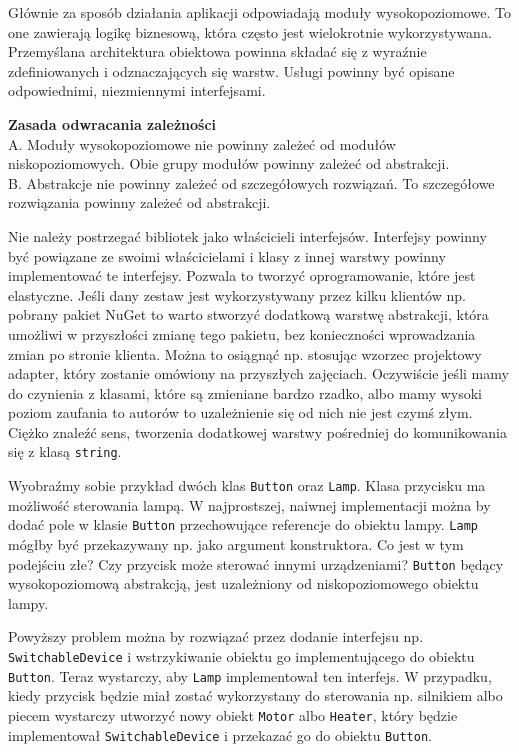 Głównie za sposób działania aplikacji odpowiadają moduły wysokopoziomowe. To one zawierają logikę biznesową, która często jest wielokrotnie wykorzystywana. Przemyślana architektura obiektowa powinna składać się z wyraźnie zdefiniowanych i odznaczających się warstw. Usługi powinny być opisane odpowiednimi, niezmiennymi interfejsami.

\begin{tcolorbox}[colback=yellow]	
	\textbf{Zasada odwracania zależności}\\
	A. Moduły wysokopoziomowe nie powinny zależeć od modułów niskopoziomowych. Obie grupy modułów powinny zależeć od abstrakcji.\\
	B. Abstrakcje nie powinny zależeć od szczegółowych rozwiązań. To szczegółowe rozwiązania powinny zależeć od abstrakcji.
\end{tcolorbox}

Nie należy postrzegać bibliotek jako właścicieli interfejsów. Interfejsy powinny być powiązane ze swoimi właścicielami i klasy z innej warstwy powinny implementować te interfejsy. Pozwala to tworzyć oprogramowanie, które jest elastyczne. Jeśli dany zestaw jest wykorzystywany przez kilku klientów np. pobrany pakiet NuGet to warto stworzyć dodatkową warstwę abstrakcji, która umożliwi w przyszłości zmianę tego pakietu, bez konieczności wprowadzania zmian po stronie klienta. Można to osiągnąć np. stosując wzorzec projektowy adapter, który zostanie omówiony na przyszłych zajęciach. Oczywiście jeśli mamy do czynienia z klasami, które są zmieniane bardzo rzadko, albo mamy wysoki poziom zaufania to autorów to uzależnienie się od nich nie jest czymś złym. Ciężko znaleźć sens, tworzenia dodatkowej warstwy pośredniej do komunikowania się z klasą \texttt{string}.

Wyobraźmy sobie przykład dwóch klas \texttt{Button} oraz \texttt{Lamp}. Klasa przycisku ma możliwość sterowania lampą. W najprostszej, naiwnej implementacji można by dodać pole w klasie \texttt{Button} przechowujące referencje do obiektu lampy. \texttt{Lamp} mógłby być przekazywany np. jako argument konstruktora. Co jest w tym podejściu złe? Czy przycisk może sterować innymi urządzeniami? \texttt{Button} będący wysokopoziomową abstrakcją, jest uzależniony od niskopoziomowego obiektu lampy.

Powyższy problem można by rozwiązać przez dodanie interfejsu np. \texttt{SwitchableDevice} i wstrzykiwanie obiektu go implementującego do obiektu \texttt{Button}. Teraz wystarczy, aby \texttt{Lamp} implementował ten interfejs. W przypadku, kiedy przycisk będzie miał zostać wykorzystany do sterowania np. silnikiem albo piecem wystarczy utworzyć nowy obiekt \texttt{Motor} albo \texttt{Heater}, który będzie implementował \texttt{SwitchableDevice} i przekazać go do obiektu \texttt{Button}.

